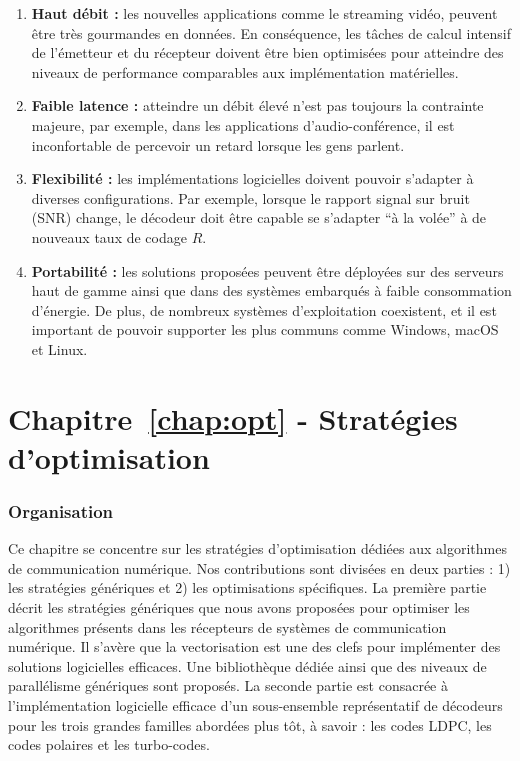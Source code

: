 \begin{enumerate}
  \item \textbf{Haut débit :}
    les nouvelles applications comme le streaming vidéo, peuvent être très
    gourmandes en données. En conséquence, les tâches de calcul intensif de
    l'émetteur et du récepteur doivent être bien optimisées pour atteindre des
    niveaux de performance comparables aux implémentation matérielles.

  \item \textbf{Faible latence :}
    atteindre un débit élevé n'est pas toujours la contrainte majeure, par
    exemple, dans les applications d'audio-conférence, il est inconfortable de
    percevoir un retard lorsque les gens parlent.

  \item \textbf{Flexibilité :}
    les implémentations logicielles doivent pouvoir s'adapter à diverses
    configurations. Par exemple, lorsque le rapport signal sur bruit (SNR)
    change, le décodeur doit être capable se s'adapter ``à la volée'' à de
    nouveaux taux de codage $R$.

  \item \textbf{Portabilité :}
    les solutions proposées peuvent être déployées sur des serveurs haut de
    gamme ainsi que dans des systèmes embarqués à faible consommation d'énergie.
    De plus, de nombreux systèmes d'exploitation coexistent, et il est important
    de pouvoir supporter les plus communs comme Windows, macOS et Linux.
\end{enumerate}

\section*{Chapitre~\ref{chap:opt} - Stratégies d'optimisation}

\subsubsection*{Organisation}

Ce chapitre se concentre sur les stratégies d'optimisation dédiées aux
algorithmes de communication numérique. Nos contributions sont divisées en deux
parties : 1) les stratégies génériques et 2) les optimisations spécifiques.
La première partie décrit les stratégies génériques que nous avons proposées
pour optimiser les algorithmes présents dans les récepteurs de systèmes de
communication numérique. Il s'avère que la vectorisation est une des clefs pour
implémenter des solutions logicielles efficaces. Une bibliothèque dédiée ainsi
que des niveaux de parallélisme génériques sont proposés. La seconde partie est
consacrée à l'implémentation logicielle efficace d'un sous-ensemble
représentatif de décodeurs pour les trois grandes familles abordées plus tôt, à
savoir : les codes LDPC, les codes polaires et les turbo-codes.

